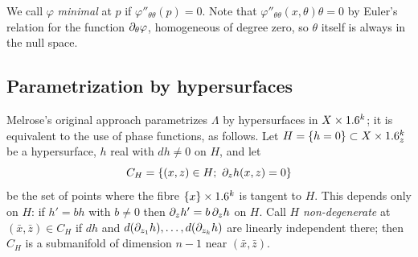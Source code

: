 We call $\varphi$ \emph{minimal} at $p$ if $\varphi''_{\theta\theta}(p)=0$.
Note that $\varphi''_{\theta\theta}(x,\theta)\theta=0$ by Euler's relation for the
function $\partial_\theta\varphi$, homogeneous of degree zero, so $\theta$ itself is
always in the null space.

\subsection{Parametrization by hypersurfaces}
Melrose's original approach parametrizes $\Lambda$ by hypersurfaces in
$X\times1.6^k$; it is equivalent to the use of phase functions, as follows.  Let
$H=\{h=0\}\subset X\times1.6^k_z$ be a hypersurface, $h$ real with $dh\neq0$ on
$H$, and let
\begin{equation*}
  C_H=\{(x,z)\in H;\ \pa_zh(x,z)=0\}
\end{equation*}
be the set of points where the fibre $\{x\}\times1.6^k$ is tangent to $H$.  This
depends only on $H$: if $h'=bh$ with $b\neq0$ then $\partial_zh'=b\,\partial_zh$ on $H$.
Call $H$ \emph{non-degenerate} at $(\bar x,\bar z)\in C_H$ if $dh$ and
$d(\partial_{z_1}h),\dots,d(\partial_{z_k}h)$ are linearly independent there; then $C_H$
is a submanifold of dimension $n-1$ near $(\bar x,\bar z)$.

